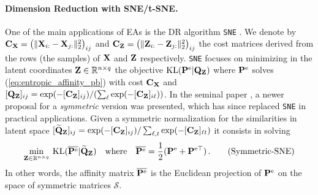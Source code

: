 \paragraph{Dimension Reduction with SNE/t-SNE.} One of the main applications of EAs
is the DR algorithm \texttt{SNE} \citep{hinton2002stochastic}. We
denote by $\mathbf{C}_{\mathbf{X}} = \left(\|\mathbf{X}_{i:}-\mathbf{X}_{j:}\|_2^2\right)_{ij}$ and $\mathbf{C}_{\mathbf{Z}} =
\left(\|\mathbf{Z}_{i:}-\mathbf{Z}_{j:}\|_2^2\right)_{ij}$ the cost matrices derived from the
rows (\ie the samples) of $\mathbf{X}$ and $\mathbf{Z}$ respectively. \texttt{SNE} focuses on
minimizing in the latent coordinates $\mathbf{Z} \in \mathbb{R}^{n \times q}$ the objective
$\operatorname{KL}(\mathbf{P}^\mathrm{e} | \mathbf{Q}_{\mathbf{Z}})$ where $\mathbf{P}^\mathrm{e}$ solves
(\ref{eq:entropic_affinity_pb}) with cost $\mathbf{C}_{\mathbf{X}}$ and $[\mathbf{Q}_{\mathbf{Z}}]_{ij} = \exp(-[\mathbf{C}_{\mathbf{Z}}]_{ij})/(\sum_{\ell}\exp(-[\mathbf{C}_{\mathbf{Z}}]_{i\ell}))$. In the seminal paper \citep{van2008visualizing}, a newer proposal for a \emph{symmetric} version was presented, which has since replaced \texttt{SNE} in practical applications. Given a symmetric
normalization for the similarities in latent space $[\widetilde{\mathbf{Q}}_{\mathbf{Z}}]_{ij} = \exp(-[\mathbf{C}_{\mathbf{Z}}]_{ij})/\sum_{\ell,t}\exp(-[\mathbf{C}_{\mathbf{Z}}]_{\ell t})$ it consists in solving 
\begin{align}\label{symmetrization_tsne}
    \min_{\mathbf{Z} \in \mathbb{R}^{n \times q}} \: \operatorname{KL}(\overline{\mathbf{P}^{\mathrm{e}}} | \widetilde{\mathbf{Q}}_{\mathbf{Z}}) \quad \text{where} \quad \overline{\mathbf{P}^{\mathrm{e}}} = \frac{1}{2}(\mathbf{P}^{\mathrm{e}} + \mathbf{P}^{\mathrm{e} \top}) \,.
\tag{Symmetric-SNE}
\end{align}
In other words, the affinity matrix $\overline{\mathbf{P}^{\mathrm{e}}}$ is the Euclidean projection of $\mathbf{P}^{\mathrm{e}}$ on the space of symmetric matrices $\mathcal{S}$.




